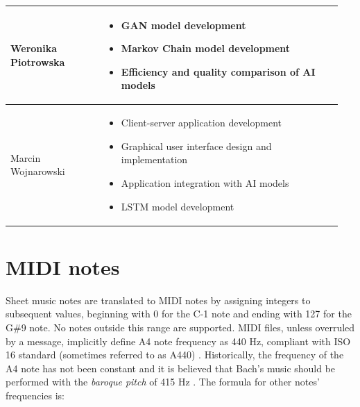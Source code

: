 \documentclass[a4paper, 11pt, twoside]{report}
\renewcommand*{\thetable}{\arabic{chapter}.\arabic{table}}
\theoremstyle{definition}
\begin{document}
\begin{table}[H]
\begin{tabular}{ |P{0.27\linewidth}|R{0.68\linewidth}| }
        \setlength{\baselineskip}{5pt}Weronika Piotrowska       &
        \setlength{\baselineskip}{5pt}\begin{itemize}
                                          \setlength{\baselineskip}{5pt}    \item GAN model development
                                                \setlength{\baselineskip}{5pt}    \item Markov Chain model development
                                                \setlength{\baselineskip}{5pt}    \item Efficiency and quality comparison of AI models
                                                \setlength{\baselineskip}{5pt}\end{itemize}       \\
        \hline

        \setlength{\baselineskip}{5pt}Marcin Wojnarowski        &
        \setlength{\baselineskip}{5pt}\begin{itemize}
                                          \setlength{\baselineskip}{5pt}    \item Client-server application development
                                                \setlength{\baselineskip}{5pt}    \item Graphical user interface design and implementation
                                                \setlength{\baselineskip}{5pt}    \item Application integration with AI models
                                                \setlength{\baselineskip}{5pt}    \item LSTM model development
                                                \setlength{\baselineskip}{5pt}\end{itemize}   \\
        \hline
    \end{tabular}
\end{table} \par

\vfill
\newpage

\chapter{MIDI notes} \label{app:notes}
\setcounter{table}{0}
\renewcommand{\thetable}{B.\arabic{table}}

Sheet music notes are translated to MIDI notes by assigning integers to subsequent values, beginning with 0 for the C-1 note and ending with 127 for the G\#9 note. No notes outside this range are supported. MIDI files, unless overruled by a message, implicitly define A4 note frequency as 440 Hz, compliant with ISO 16 standard (sometimes referred to as A440) \cite{MIDI1_spec}. Historically, the frequency of the A4 note has not been constant and it is believed that Bach's music should be performed with the \textit{baroque pitch} of 415 Hz \cite{Bach_dict}. The formula for other notes' frequencies is:
\end{document}
